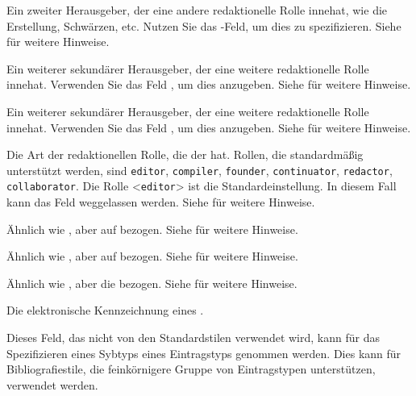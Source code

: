 \documentclass{ltxdockit}[2011/03/25]
\begin{document}
\begin{fieldlist}

Ein zweiter Herausgeber, der eine andere redaktionelle Rolle innehat, wie die
Erstellung, Schwärzen, etc. Nutzen Sie das -Feld, um dies
zu spezifizieren. Siehe  für weitere Hinweise.


Ein weiterer sekundärer Herausgeber, der eine weitere redaktionelle Rolle
innehat. Verwenden Sie das Feld , um dies anzugeben. Siehe
 für weitere Hinweise.


Ein weiterer sekundärer Herausgeber, der eine weitere redaktionelle Rolle
innehat. Verwenden Sie das Feld , um dies anzugeben. Siehe
 für weitere Hinweise.


Die Art der redaktionellen Rolle, die der  hat. Rollen, die
standardmäßig unterstützt werden, sind \texttt{editor}, \texttt{compiler},
\texttt{founder}, \texttt{continuator}, \texttt{redactor},
\texttt{colla\-borator}. Die Rolle <\texttt{editor}> ist die Standardeinstellung.
In diesem Fall kann das Feld weggelassen werden. Siehe  für
weitere Hinweise.


Ähnlich wie , aber auf  bezogen. Siehe
 für weitere Hinweise.


Ähnlich wie , aber auf  bezogen. Siehe
 für weitere Hinweise.


Ähnlich wie , aber die  bezogen. Siehe
 für weitere Hinweise.


Die elektronische Kennzeichnung eines .


Dieses Feld, das nicht von den Standardstilen verwendet wird, kann für das Spezifizieren eines Sybtyps eines Eintragstyps genommen werden. Dies kann für Bibliografiestile, die
feinkörnigere Gruppe von Eintragstypen unterstützen, verwendet werden.


\end{fieldlist}
\end{document}
